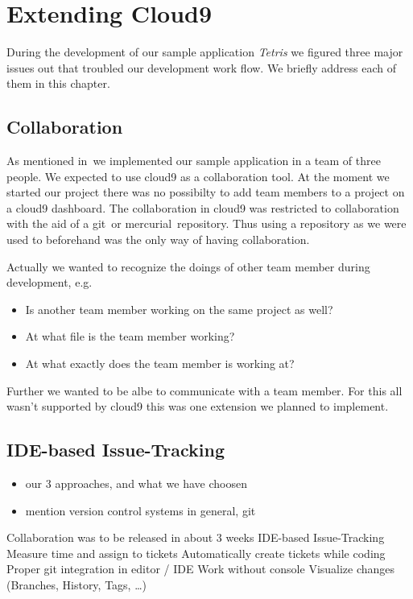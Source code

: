 \section{Extending Cloud9}
\label{sec:Approaches}
During the development of our sample application \emph{Tetris} we figured three major issues out that troubled our development work flow.
We briefly address each of them in this chapter.

\subsection{Collaboration}
As mentioned in~ we implemented our sample application in a team of three people.
We expected to use cloud9 as a collaboration tool.
At the moment we started our project there was no possibilty to add team members to a project on a cloud9 dashboard.
The collaboration in cloud9 was restricted to collaboration with the aid of a git~\needcite or mercurial~\needcite repository.
Thus using a repository as we were used to beforehand was the only way of having collaboration.

Actually we wanted to recognize the doings of other team member during development, e.g.
\begin{itemize}
	\item Is another team member working on the same project as well?
	\item At what file is the team member working?
	\item At what exactly does the team member is working at?
\end{itemize}
Further we wanted to be albe to communicate with a team member.
For this all wasn't supported by cloud9 this was one extension we planned to implement.

\subsection{IDE-based Issue-Tracking}


\begin{itemize}
	\item our 3 approaches, and what we have choosen
	\item mention version control systems in general, git
\end{itemize}


Collaboration was to be released in about 3 weeks
IDE-based Issue-Tracking
	Measure time and assign to tickets
	Automatically create tickets while coding
Proper git integration in editor / IDE
	Work without console
	Visualize changes
	(Branches, History, Tags, …)

